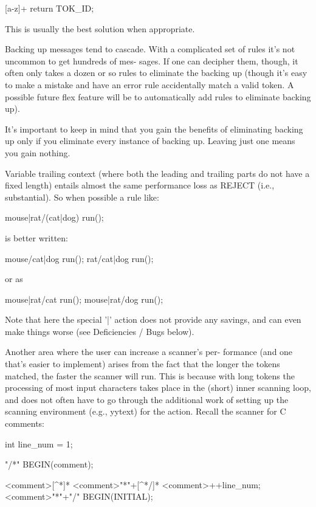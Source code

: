 \documentclass[12pt,spanish,twocolumn,lettersize]{article}
\begin{document}
{	   [a-z]+      return TOK_ID;

       This is usually the best solution when appropriate.

       Backing	up  messages tend to cascade.  With a complicated
       set of rules it's not uncommon to  get  hundreds	 of  mes-
       sages.	If  one	 can decipher them, though, it often only
       takes a dozen or so rules  to  eliminate	 the  backing  up
       (though it's easy to make a mistake and have an error rule
       accidentally match a valid token.  A possible future  flex
       feature	will  be  to automatically add rules to eliminate
       backing up).

       It's important to keep in mind that you gain the	 benefits
       of  eliminating	backing	 up  only  if you eliminate every
       instance of backing up.	Leaving just one means	you  gain
       nothing.

       Variable	 trailing  context  (where  both  the leading and
       trailing parts do not have a fixed length) entails  almost
       the  same  performance loss as REJECT (i.e., substantial).
       So when possible a rule like:

	   mouse|rat/(cat|dog)	 run();

       is better written:

	   mouse/cat|dog	 run();
	   rat/cat|dog		 run();

       or as

	   mouse|rat/cat	 run();
	   mouse|rat/dog	 run();

       Note that here the special '|' action does not provide any
       savings,	 and can even make things worse (see Deficiencies
       / Bugs below).

       Another area where the user can increase a scanner's  per-
       formance	 (and one that's easier to implement) arises from
       the fact that the longer the tokens  matched,  the  faster
       the  scanner  will  run.	 This is because with long tokens
       the processing of most input characters takes place in the
       (short) inner scanning loop, and does not often have to go
       through the additional work of  setting	up  the	 scanning
       environment  (e.g.,  yytext)  for  the action.  Recall the
       scanner for C comments:

		   int line_num = 1;

	   "/*"		BEGIN(comment);

	   <comment>[^*\n]*
	   <comment>"*"+[^*/\n]*
	   <comment>\n		   ++line_num;
	   <comment>"*"+"/"	   BEGIN(INITIAL);

}
\end{document}
